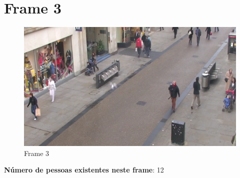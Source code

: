 \section{Frame 3}


\begin{figure}[h]
	\centering
	\includegraphics[width=0.7\linewidth]{img/vision/frame3.png}
	\caption{Frame 3 }
	\label{db}
\end{figure}

\textbf{Número de pessoas existentes neste frame}: 12


